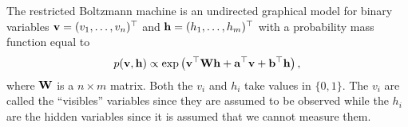   

%
The restricted Boltzmann machine is an undirected
graphical model for binary variables $\mathbf{v} =(v_1, \ldots, v_n)^\top$ and
$\mathbf{h}=(h_1, \ldots, h_m)^\top$ with a probability mass function equal to
\begin{equation}
  p(\mathbf{v},\mathbf{h}) \propto \exp\left( \mathbf{v}^\top \mathbf{W} \mathbf{h} + \mathbf{a}^\top\mathbf{v} + \mathbf{b}^\top\mathbf{h} \right),
\end{equation}
where $\mathbf{W}$ is a $n \times m$ matrix. Both the $v_i$ and $h_i$ take values in $\{0,1\}$. The
$v_i$ are called the ``visibles'' variables since they are assumed to
be observed while the $h_i$ are the hidden variables since it is
assumed that we cannot measure them.

